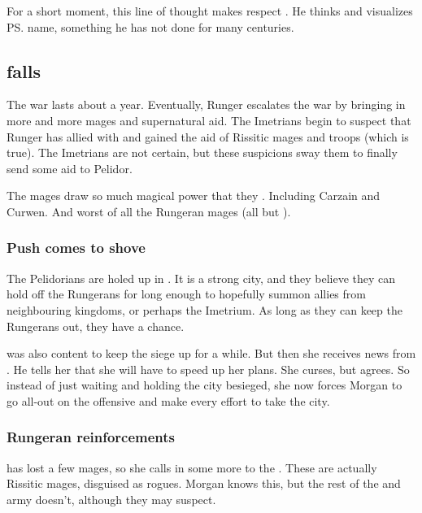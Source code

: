 For a short moment, this line of thought makes \Secherdamon{} respect \Ishnaruchaefir{}. 
He thinks and visualizes \ps{\Ishnaruchaefir} name, something he has not done for many centuries. 












\subsection{\Forclin falls}
The war lasts about a year. Eventually, Runger escalates the war by bringing in more and more mages and supernatural aid. 
The Imetrians begin to suspect that Runger has allied with \Durcac and gained the aid of Rissitic mages and troops (which is true). 
The Imetrians are not certain, but these suspicions sway them to finally send some aid to Pelidor. 

The mages draw so much magical power that they . 
Including Carzain and Curwen. 
And worst of all the Rungeran mages (all but \Takestsha). 





\subsubsection{Push comes to shove}
The Pelidorians are holed up in \Forclin. 
It is a strong city, and they believe they can hold off the Rungerans for long enough to hopefully summon allies from neighbouring kingdoms, or perhaps the Imetrium. 
As long as they can keep the Rungerans out, they have a chance. 

\Takestsha{} was also content to keep the siege up for a while. 
But then she receives news from \LocarPsyrex. 
He tells her that she will have to speed up her plans. 
She curses, but agrees. 
So instead of just waiting and holding the city besieged, she now forces Morgan to go all-out on the offensive and make every effort to take the city. 





\subsubsection{Rungeran reinforcements}
\Takestsha{} has lost a few mages, so she calls in some more  to the \ishrah. 
These are actually Rissitic mages, disguised as rogues. 
Morgan knows this, but the rest of the \ishrah{} and army doesn't, although they may suspect. 

